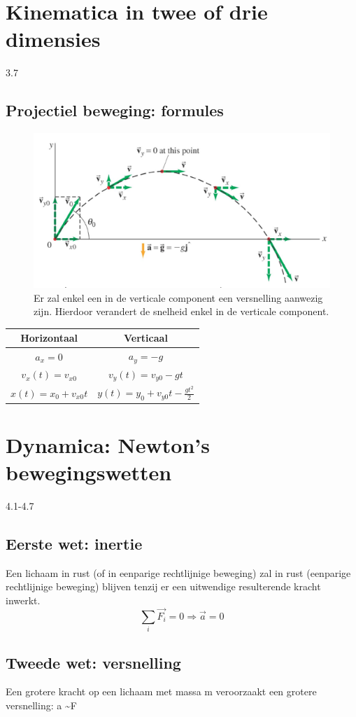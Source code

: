 \documentclass[12pt,a4paper]{article}
\begin{document}
	\section{Kinematica in twee of drie dimensies}
	3.7
	\subsection{Projectiel beweging: formules}
	\begin{figure}[h]
		\centering
		\includegraphics[width=0.7\linewidth]{projectiel}
		\caption{Er zal enkel een in de verticale component een versnelling aanwezig zijn. Hierdoor verandert de snelheid enkel in de verticale component.}
		\label{projectiel}
	\end{figure}
\begin{table}[h]
	\centering
	\begin{tabular}{|c|c|}
		\hline
		\textbf{Horizontaal} & \textbf{Verticaal} \\
		\hline
		\(a_x = 0\)&\(a_y = -g\)  \\
		\hline
		\(v_x(t) = v_{x0}\)&\(v_y(t) = v_{y0} - gt\)  \\
		\hline
		\(x(t) = x_0 + v_{x0}t\)&\(y(t) = y_0 + v_{y0}t - \frac{gt^2}{2}\)  \\
		\hline
	\end{tabular}
\end{table}
	\section{Dynamica: Newton's bewegingswetten}
	4.1-4.7
	\subsection{Eerste wet: inertie}
	Een lichaam in rust (of in eenparige rechtlijnige beweging) zal in rust (eenparige rechtlijnige beweging) blijven tenzij er een uitwendige resulterende kracht inwerkt.
	\[\sum_{i}\overrightarrow{F_i} = 0 \Rightarrow \overrightarrow{a} = 0\]
	\subsection{Tweede wet: versnelling}
	Een grotere kracht op een lichaam met massa m veroorzaakt een grotere versnelling: a \textasciitilde F
	
\end{document}
